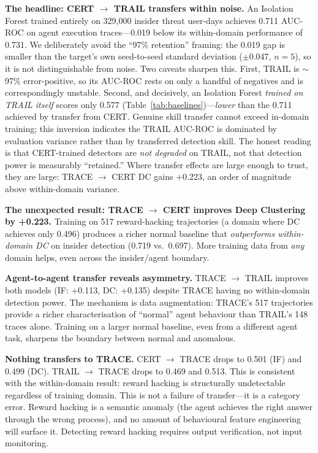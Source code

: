 \documentclass[conference]{IEEEtran}
\begin{document}
\textbf{The headline: CERT $\to$ TRAIL transfers within noise.} An Isolation Forest trained entirely on 329,000 insider threat user-days achieves 0.711 AUC-ROC on agent execution traces---0.019 below its within-domain performance of 0.731. We deliberately avoid the ``97\% retention'' framing: the 0.019 gap is smaller than the target's own seed-to-seed standard deviation ($\pm$0.047, $n{=}5$), so it is not distinguishable from noise. Two caveats sharpen this. First, TRAIL is ${\sim}$97\% error-positive, so its AUC-ROC rests on only a handful of negatives and is correspondingly unstable. Second, and decisively, an Isolation Forest \emph{trained on TRAIL itself} scores only 0.577 (Table~\ref{tab:baselines})---\emph{lower} than the 0.711 achieved by transfer from CERT. Genuine skill transfer cannot exceed in-domain training; this inversion indicates the TRAIL AUC-ROC is dominated by evaluation variance rather than by transferred detection skill. The honest reading is that CERT-trained detectors are \emph{not degraded} on TRAIL, not that detection power is measurably ``retained.'' Where transfer effects are large enough to trust, they are large: TRACE $\to$ CERT DC gains +0.223, an order of magnitude above within-domain variance.

\textbf{The unexpected result: TRACE $\to$ CERT improves Deep Clustering by +0.223.} Training on 517 reward-hacking trajectories (a domain where DC achieves only 0.496) produces a richer normal baseline that \textit{outperforms within-domain DC} on insider detection (0.719 vs.\ 0.697). More training data from \textit{any} domain helps, even across the insider/agent boundary.

\textbf{Agent-to-agent transfer reveals asymmetry.} TRACE $\to$ TRAIL improves both models (IF: +0.113, DC: +0.135) despite TRACE having no within-domain detection power. The mechanism is data augmentation: TRACE's 517 trajectories provide a richer characterisation of ``normal'' agent behaviour than TRAIL's 148 traces alone. Training on a larger normal baseline, even from a different agent task, sharpens the boundary between normal and anomalous.

\textbf{Nothing transfers to TRACE.} CERT $\to$ TRACE drops to 0.501 (IF) and 0.499 (DC). TRAIL $\to$ TRACE drops to 0.469 and 0.513. This is consistent with the within-domain result: reward hacking is structurally undetectable regardless of training domain. This is not a failure of transfer---it is a category error. Reward hacking is a semantic anomaly (the agent achieves the right answer through the wrong process), and no amount of behavioural feature engineering will surface it. Detecting reward hacking requires output verification, not input monitoring.
\end{document}
